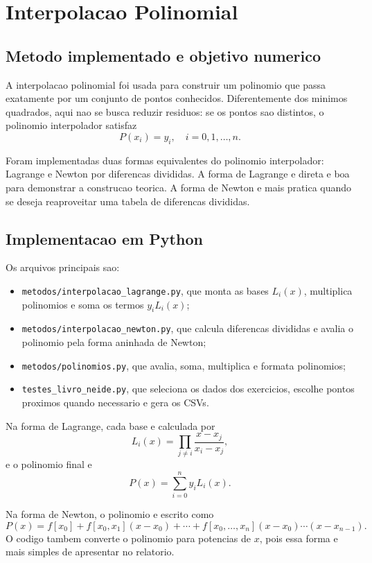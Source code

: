 \documentclass[../main.tex]{subfiles}
\begin{document}
\section{Interpolacao Polinomial}

\subsection{Metodo implementado e objetivo numerico}

A interpolacao polinomial foi usada para construir um polinomio que passa
exatamente por um conjunto de pontos conhecidos. Diferentemente dos minimos
quadrados, aqui nao se busca reduzir residuos: se os pontos sao distintos, o
polinomio interpolador satisfaz
\[
    P(x_i)=y_i,\quad i=0,1,\ldots,n.
\]

Foram implementadas duas formas equivalentes do polinomio interpolador:
Lagrange e Newton por diferencas divididas. A forma de Lagrange e direta e boa
para demonstrar a construcao teorica. A forma de Newton e mais pratica quando
se deseja reaproveitar uma tabela de diferencas divididas.

\subsection{Implementacao em Python}

Os arquivos principais sao:

\begin{itemize}
    \item \texttt{metodos/interpolacao\_lagrange.py}, que monta as bases
    \(L_i(x)\), multiplica polinomios e soma os termos \(y_iL_i(x)\);
    \item \texttt{metodos/interpolacao\_newton.py}, que calcula diferencas
    divididas e avalia o polinomio pela forma aninhada de Newton;
    \item \texttt{metodos/polinomios.py}, que avalia, soma, multiplica e formata
    polinomios;
    \item \texttt{testes\_livro\_neide.py}, que seleciona os dados dos
    exercicios, escolhe pontos proximos quando necessario e gera os CSVs.
\end{itemize}

Na forma de Lagrange, cada base e calculada por
\[
    L_i(x)=\prod_{j\ne i}\frac{x-x_j}{x_i-x_j},
\]
e o polinomio final e
\[
    P(x)=\sum_{i=0}^{n}y_iL_i(x).
\]

Na forma de Newton, o polinomio e escrito como
\[
    P(x)=f[x_0]+f[x_0,x_1](x-x_0)+\cdots+
    f[x_0,\ldots,x_n](x-x_0)\cdots(x-x_{n-1}).
\]
O codigo tambem converte o polinomio para potencias de \(x\), pois essa forma e
mais simples de apresentar no relatorio.
\end{document}
